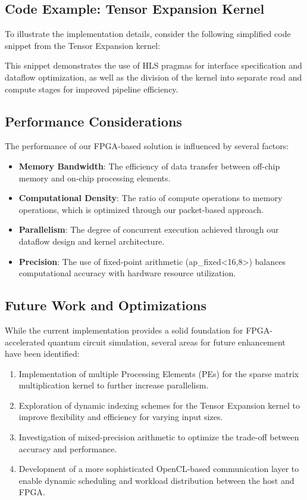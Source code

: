 \documentclass[12pt,oneside,a4paper]{article}
\begin{document}
\subsection{Code Example: Tensor Expansion Kernel}

To illustrate the implementation details, consider the following simplified code snippet from the Tensor Expansion kernel:

This snippet demonstrates the use of HLS pragmas for interface specification and dataflow optimization, as well as the division of the kernel into separate read and compute stages for improved pipeline efficiency.

\subsection{Performance Considerations}

The performance of our FPGA-based solution is influenced by several factors:

\begin{itemize}
    \item \textbf{Memory Bandwidth}: The efficiency of data transfer between off-chip memory and on-chip processing elements.
    \item \textbf{Computational Density}: The ratio of compute operations to memory operations, which is optimized through our packet-based approach.
    \item \textbf{Parallelism}: The degree of concurrent execution achieved through our dataflow design and kernel architecture.
    \item \textbf{Precision}: The use of fixed-point arithmetic (ap_fixed<16,8>) balances computational accuracy with hardware resource utilization.
\end{itemize}

\subsection{Future Work and Optimizations}

While the current implementation provides a solid foundation for FPGA-accelerated quantum circuit simulation, several areas for future enhancement have been identified:

\begin{enumerate}
    \item Implementation of multiple Processing Elements (PEs) for the sparse matrix multiplication kernel to further increase parallelism.
    \item Exploration of dynamic indexing schemes for the Tensor Expansion kernel to improve flexibility and efficiency for varying input sizes.
    \item Investigation of mixed-precision arithmetic to optimize the trade-off between accuracy and performance.
    \item Development of a more sophisticated OpenCL-based communication layer to enable dynamic scheduling and workload distribution between the host and FPGA.
\end{enumerate}
\end{document}
